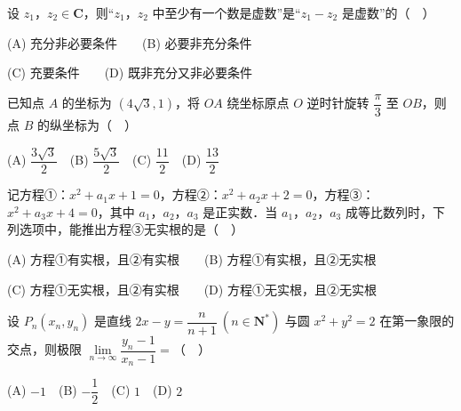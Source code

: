 \begin{question}
设 \(z_{1}\)，\(z_{2}\in\mathbf{C}\)，则“\(z_{1}\)，\(z_{2}\) 中至少有一个数是虚数”是“\(z_{1}-z_{2}\) 是虚数”的（　）

(A) 充分非必要条件　　(B) 必要非充分条件

(C) 充要条件　　(D) 既非充分又非必要条件

\end{question}
\begin{question}
已知点 \(A\) 的坐标为 \((4\sqrt{3},1)\)，将 \(OA\) 绕坐标原点 \(O\) 逆时针旋转 \(\dfrac{\pi}{3}\) 至 \(OB\)，则点 \(B\) 的纵坐标为（　）

(A) \(\dfrac{3\sqrt{3}}{2}\)　(B) \(\dfrac{5\sqrt{3}}{2}\)　(C) \(\dfrac{11}{2}\)　(D) \(\dfrac{13}{2}\)

\end{question}
\begin{question}
记方程①：\(x^{2}+a_{1}x+1=0\)，方程②：\(x^{2}+a_{2}x+2=0\)，方程③：\(x^{2}+a_{3}x+4=0\)，其中 \(a_{1}\)，\(a_{2}\)，\(a_{3}\) 是正实数．当 \(a_{1}\)，\(a_{2}\)，\(a_{3}\) 成等比数列时，下列选项中，能推出方程③无实根的是（　）

(A) 方程①有实根，且②有实根　　(B) 方程①有实根，且②无实根

(C) 方程①无实根，且②有实根　　(D) 方程①无实根，且②无实根

\end{question}
\begin{question}
设 \(P_{n}(x_{n},y_{n})\) 是直线 \(2x-y=\dfrac{n}{n+1}\ (n\in\mathbf{N}^{*})\) 与圆 \(x^{2}+y^{2}=2\) 在第一象限的交点，则极限 \(\lim\limits_{n\to\infty}\dfrac{y_{n}-1}{x_{n}-1}=\)（　）

(A) \(-1\)　(B) \(-\dfrac{1}{2}\)　(C) \(1\)　(D) \(2\)

\end{question}

